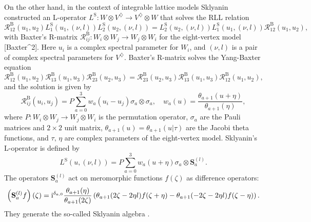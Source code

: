 On the other hand, in the context of integrable lattice models Sklyanin
constructed an L-operator $L^{\mathrm{S}}:W\otimes V^{\diamondsuit}\rightarrow V^{\diamondsuit}\otimes W$
that solves the RLL relation \cite{MR684124}
\begin{equation}
    \mathcal{R}_{12}^{\mathrm{B}}(u_{1},u_{2})
    L_{1}^{\mathrm{S}}\left(u_{1},\left(\nu,l\right)\right)
    L_{2}^{\mathrm{S}}\left(u_{2},\left(\nu,l\right)\right)
      =
          L_{2}^{\mathrm{S}}\left(u_{2},\left(\nu,l\right)\right)
          L_{1}^{\mathrm{S}}\left(u_{1},\left(\nu,l\right)\right)
          \mathcal{R}_{12}^{\mathrm{B}}(u_{1},u_{2}),
\end{equation}
with Baxter's R-matrix $\mathcal{R}_{ij}^{\mathrm{B}}:W_{i}\otimes W_{j}\rightarrow W_{j}\otimes W_{i}$
for the eight-vertex model {[}Baxter\textasciicircum 2{]}. Here $u_{i}$
is a complex spectral parameter for $W_{i}$, and $\left(\nu,l\right)$
is a pair of complex spectral parameters for $V^{\diamondsuit}$.
Baxter's R-matrix solves the Yang-Baxter equation
\begin{equation}
    \mathcal{R}_{12}^{\mathrm{B}}(u_{1},u_{2})
    \mathcal{R}_{13}^{\mathrm{B}}(u_{1},u_{3})
    \mathcal{R}_{23}^{\mathrm{B}}(u_{2},u_{3})
      =
        \mathcal{R}_{23}^{\mathrm{B}}(u_{2},u_{3})
        \mathcal{R}_{13}^{\mathrm{B}}(u_{1},u_{3})
        \mathcal{R}_{12}^{\mathrm{B}}(u_{1},u_{2}),
\end{equation}
 and the solution is given by
\begin{equation}
    \mathcal{R}_{ij}^{\mathrm{B}}(u_{i},u_{j})
      =  P\sum_{a=0}^{3}w_{a}(u_{i}-u_{j})  \sigma_{a}  \otimes  \sigma_{a},
        \quad  w_{a}(u)  =  \frac{\theta_{a+1}(u+\eta)}{\theta_{a+1}(\eta)},
\end{equation}
 where $P:W_{i}\otimes W_{j}\rightarrow W_{j}\otimes W_{i}$ is the
permutation operator, $\sigma_{a}$ are the Pauli matrices and $2\times2$
unit matrix, $\theta_{a+1}(u)=\theta_{a+1}(u|\tau)$ are the Jacobi
theta functions, and $\tau,\,\eta$ are complex parameters of the
eight-vertex model. Sklyanin's L-operator is defined by
\begin{equation}
    L^{\mathrm{S}}\left(u,\left(\nu,l\right)\right)
      =  P\sum_{a=0}^{3}w_{a}(u+\eta)  \sigma_{a}  \otimes  \mathbf{S}_{a}^{(l)}.
\end{equation}
The operators $\mathbf{S}_{a}^{(l)}$ act on meromorphic functions
$f(\zeta)$ as difference operators:
\begin{equation}
    \left(\mathbf{S}_{a}^{(l)}f\right)(\zeta)
      =  \mathrm{i}^{\delta_{a,0}}\frac{\theta_{a+1}(\eta)}{\theta_{a+1}(2\zeta)}
          \left(\theta_{a+1}(2\zeta-2\eta l)f(\zeta+\eta)-\theta_{a+1}(-2\zeta-2\eta l)f(\zeta-\eta)\right).
\end{equation}
 They generate the so-called Sklyanin algebra \cite{MR725414}.

